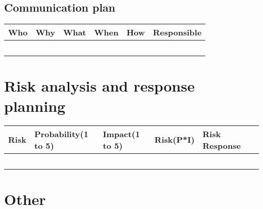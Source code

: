 \documentclass[10pt]{projectdoc}
\begin{document}
\subsection{Communication plan }


\begin{table}[H]
\begin{tabularx}{\columnwidth}{|X|X|X|X|X|X|}
    \hline
    Who & Why & What & When & How & Responsible                   \\ \hline
    &     &      &      &     &                                   \\ \hline 
    &     &      &      &     &                                   \\ \hline 
    &     &      &      &     &                                   \\ \hline 
    &     &      &      &     &                                   \\ \hline 
    &     &      &      &     &                                   \\ \hline
\end{tabularx}
\end{table}

\section{Risk analysis and response planning}
\begin{table}[H]
\begin{tabularx}{\columnwidth}{|X|X|X|X|X|X|}
\hline
Risk & Probability(1 to 5) & Impact(1 to 5) & Risk(P*I) & Risk Response \\ \hline
     &                     &                &           &               \\ \hline
     &                     &                &           &               \\ \hline
     &                     &                &           &               \\ \hline
     &                     &                &           &               \\ \hline
     &                     &                &           &               \\ \hline
\end{tabularx}
\end{table}

\section{Other}

\end{document}
